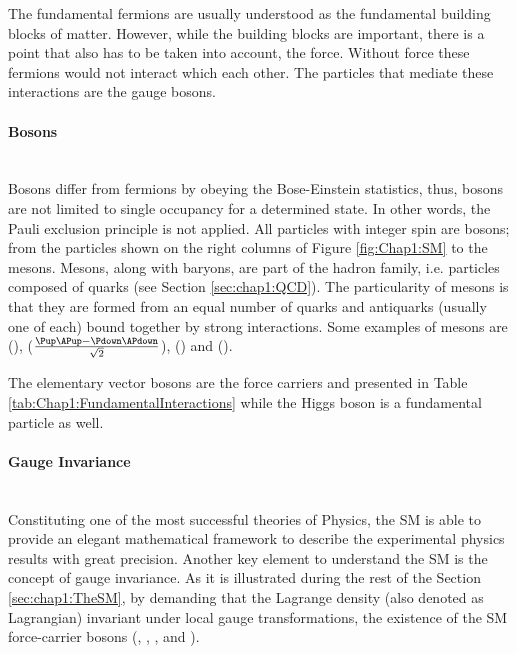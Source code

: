 The fundamental fermions are usually understood as the fundamental building blocks of matter. However, while the building blocks are important, there is a point that 
also has to be taken into account, the force. Without force these fermions would not interact which each other. The particles that mediate these interactions are the
gauge bosons. 




\paragraph{Bosons}\mbox{}\\
Bosons differ from fermions by obeying the Bose-Einstein statistics, thus, bosons are not limited to single occupancy for a determined state. In other words,
the Pauli exclusion principle is not applied. All particles with integer spin are bosons; from the particles shown on the right columns of Figure \ref{fig:Chap1:SM}
to the mesons. Mesons, along with baryons, are part of the hadron family, i.e. particles composed of quarks (see Section \ref{sec:chap1:QCD}). 
The particularity of mesons is that they are formed from an equal number of quarks and antiquarks (usually one of each) bound together by strong 
interactions. Some examples of mesons are \Ppiplus (\Pup \APdown), \Ppizero ($\frac{\Pup \APup - \Pdown \APdown}{\sqrt{2}}$), \PKplus (\Pup \APstrange) and \PJpsi(\Pcharm \APcharm).

The elementary vector bosons are the force carriers and presented in Table \ref{tab:Chap1:FundamentalInteractions} while the Higgs boson is a fundamental particle as well. 


\paragraph{Gauge Invariance}\mbox{}\\
Constituting one of the most successful theories of Physics, the SM is able to provide an elegant mathematical framework to
describe the experimental physics results with great precision.
Another key element to understand the SM is the concept of gauge invariance.
As it is illustrated during the rest of the Section \ref{sec:chap1:TheSM}, by demanding that 
the Lagrange density (also denoted as Lagrangian) invariant
under local gauge transformations, the existence of the SM force-carrier 
bosons (\Pgamma, \PWplus, \PWminus, \PZ and \Pg). %


